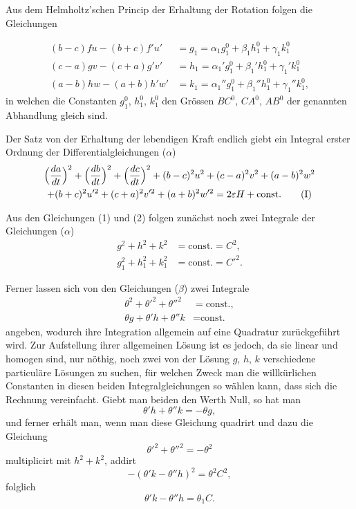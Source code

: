 \documentclass[12pt,a4paper]{book}
\theoremstyle{definition}
\theoremstyle{remark}
\begin{document}
Aus dem Helmholtz'schen Princip der Erhaltung der Rotation folgen die Gleichungen

\begin{align*}
(b - c)fu - (b + c)f'u' &= g_{1} = \alpha_{1} g_{1}^{0} + \beta_{1} h_{1}^{0} + \gamma_{1} k_{1}^{0}\\
(c - a)gv - (c + a)g'v' &= h_{1} = \alpha_{1}' g_{1}^{0} + \beta_{1}' h_{1}^{0} + \gamma_{1}' k_{1}^{0}\\
(a - b)hw - (a + b)h'w' &= k_{1} = \alpha_{1}'' g_{1}^{0} + \beta_{1}'' h_{1}^{0} + \gamma_{1}'' k_{1}^{0},\tag{2}
\end{align*}
in welchen die Constanten $g_{1}^{0}$, $h_{1}^{0}$, $k_{1}^{0}$ den Gr\"ossen $BC^{0}$, $CA^{0}$, $AB^{0}$ der genannten Abhandlung gleich sind.

Der Satz von der Erhaltung der lebendigen Kraft endlich giebt ein Integral erster Ordnung der Differentialgleichungen ($\alpha$)
\begin{multline*}
\Bigl(\frac{da}{dt}\Bigr)^{2} + \Bigl(\frac{db}{dt}\Bigr)^{2} + \Bigl(\frac{dc}{dt}\Bigr)^{2} + (b - c)^{2}u^{2} + (c - a)^{2}v^{2} + (a - b)^{2}w^{2}\\
+ (b + c)^{2}u'^{2} + (c + a)^{2}v'^{2} + (a + b)^{2}w'^{2} = 2\varepsilon H + \text{const.}\tag{I}
\end{multline*}

Aus den Gleichungen (1) und (2) folgen zun\"achst noch zwei Integrale der Gleichungen ($\alpha$)
\begin{align*}
g^{2} + h^{2} + k^{2} &= \text{const.} = C^{2},\tag{II}\\
g_{1}^{2} + h_{1}^{2} + k_{1}^{2} &= \text{const.} = C'^{2}.\tag{III}
\end{align*}

Ferner lassen sich von den Gleichungen ($\beta$) zwei Integrale
\begin{align*}
\theta^{2} + \theta'^{2} + \theta''^{2} &= \text{const.},\tag{IV}\\
\theta g + \theta' h + \theta'' k &= \text{const.}\tag{V}
\end{align*}
angeben, wodurch ihre Integration allgemein auf eine Quadratur zur\"uckgef\"uhrt wird. Zur Aufstellung ihrer allgemeinen L\"osung ist es jedoch, da sie linear und homogen sind, nur n\"othig, noch zwei von der L\"osung $g$, $h$, $k$ verschiedene particul\"are L\"osungen zu suchen, f\"ur welchen Zweck man die willk\"urlichen Constanten in diesen beiden Integralgleichungen so w\"ahlen kann, dass sich die Rechnung vereinfacht. Giebt man beiden den Werth Null, so hat man
\begin{equation*}
\theta' h + \theta'' k = -\theta g,\tag{3}
\end{equation*}
und ferner erh\"alt man, wenn man diese Gleichung quadrirt und dazu die Gleichung
\[
\theta'^{2} + \theta''^{2} = -\theta^{2}
\]
multiplicirt mit $h^{2} + k^{2}$, addirt
\[
-(\theta' k - \theta'' h)^{2} = \theta^{2}C^{2},
\]
folglich
\begin{equation*}
\theta' k - \theta'' h = \theta_{1} C.\tag{4}
\end{equation*}
\end{document}
